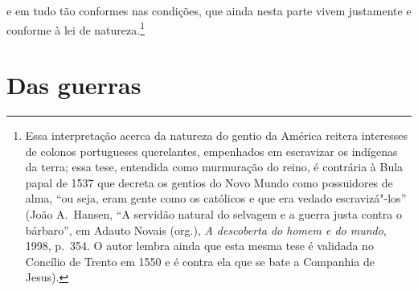 \pagebreak

\noindent{}e em tudo tão conformes
nas condições, que ainda nesta parte vivem justamente e conforme à lei		
de natureza.\footnote{ Essa interpretação acerca da natureza do 
gentio da América reitera interesses de colonos portugueses querelantes,
empenhados em escravizar os indígenas da terra; essa tese, entendida como
murmuração do reino, é contrária à Bula papal de 1537 que decreta os gentios do
Novo Mundo como possuidores de alma, ``ou seja, eram gente como os católicos e
que era vedado escravizá"-los'' (João A.~Hansen, ``A servidão natural do selvagem e a guerra  
justa contra o bárbaro'', em Adauto Novais (org.), \textit{A descoberta do homem e do mundo}, 1998, p.~354. O autor lembra ainda que esta mesma tese é validada no  
Concílio de Trento em 1550 e é contra ela que se bate a Companhia de Jesus).} 		%



\chapter[Das guerras]{Das guerras}						  



